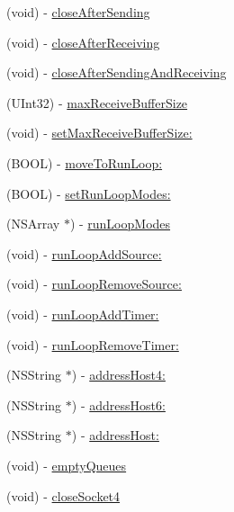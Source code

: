 \begin{DoxyCompactItemize}
\item 
(void) -\/ \hyperlink{interface_async_udp_socket_ab99e57c9ab479162ccf963516f78021b}{closeAfterSending}
\item 
(void) -\/ \hyperlink{interface_async_udp_socket_a510acfabeae204cbfbc32259f9c97817}{closeAfterReceiving}
\item 
(void) -\/ \hyperlink{interface_async_udp_socket_a50d02ef0641be6d2faafa6a9fa6305b0}{closeAfterSendingAndReceiving}
\item 
(UInt32) -\/ \hyperlink{interface_async_udp_socket_af434a0a1668265bfe0921a9d2b51a43e}{maxReceiveBufferSize}
\item 
(void) -\/ \hyperlink{interface_async_udp_socket_a1c08e2a89015e7f3a2f5d3737494a036}{setMaxReceiveBufferSize:}
\item 
(BOOL) -\/ \hyperlink{interface_async_udp_socket_a111317eafc9694b30edb4c36f513aa07}{moveToRunLoop:}
\item 
(BOOL) -\/ \hyperlink{interface_async_udp_socket_aa6f2d16021ad8de163e5299f8497384e}{setRunLoopModes:}
\item 
(NSArray $\ast$) -\/ \hyperlink{interface_async_udp_socket_a9f8974eb549e1b8c750a613369188245}{runLoopModes}
\item 
(void) -\/ \hyperlink{interface_async_udp_socket_a75ababb9f489e363e2f2a0400a258508}{runLoopAddSource:}
\item 
(void) -\/ \hyperlink{interface_async_udp_socket_a690225f977216c6c6fc151bb4ef43e36}{runLoopRemoveSource:}
\item 
(void) -\/ \hyperlink{interface_async_udp_socket_acb0aace1fe5ef1c0452cad615451acfd}{runLoopAddTimer:}
\item 
(void) -\/ \hyperlink{interface_async_udp_socket_a15eb41629b49b8efdd181cbe9fa11137}{runLoopRemoveTimer:}
\item 
(NSString $\ast$) -\/ \hyperlink{interface_async_udp_socket_a6ab003d04b2ea43ba7e4c773f8f00cb5}{addressHost4:}
\item 
(NSString $\ast$) -\/ \hyperlink{interface_async_udp_socket_aad3a045784ab0597ca274bedd8796385}{addressHost6:}
\item 
(NSString $\ast$) -\/ \hyperlink{interface_async_udp_socket_abb33bbbb4fa671a0f763d4d9f62645e1}{addressHost:}
\item 
(void) -\/ \hyperlink{interface_async_udp_socket_a380f6dc6ed4dfc3a60b33d7ed6e65c73}{emptyQueues}
\item 
(void) -\/ \hyperlink{interface_async_udp_socket_a0df11605b11617b70eda19583a8bbf29}{closeSocket4}
\item 

\end{DoxyCompactItemize}
